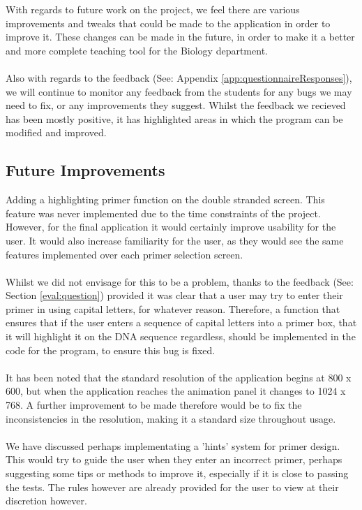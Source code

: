 With regards to future work on the project, we feel there are various improvements and tweaks that could be made to the application in order to improve it. These changes can be made in the future, in order to make it a better and more complete teaching tool for the Biology department. \\ \\
Also with regards to the feedback (See: Appendix \ref{app:questionnaireResponses}), we will continue to monitor any feedback from the students for any bugs we may need to fix, or any improvements they suggest. Whilst the feedback we recieved has been mostly positive, it has highlighted areas in which the program can be modified and improved.

\subsection{Future Improvements}

Adding a highlighting primer function on the double stranded screen. This feature was never implemented due to the time constraints of the project. However, for the final application it would certainly improve usability for the user. It would also increase familiarity for the user, as they would see the same features implemented over each primer selection screen. \\ \\

Whilst we did not envisage for this to be a problem, thanks to the feedback (See: Section \ref{eval:question}) provided it was clear that a user may try to enter their primer in using capital letters, for whatever reason. Therefore, a function that ensures that if the user enters a sequence of capital letters into a primer box, that it will highlight it on the DNA sequence regardless, should be implemented in the code for the program, to ensure this bug is fixed. \\ \\

It has been noted that the standard resolution of the application begins at 800 x 600, but when the application reaches the animation panel it changes to 1024 x 768. A further improvement to be made therefore would be to fix the inconsistencies in the resolution, making it a standard size throughout usage. \\ \\

We have discussed perhaps implementating a 'hints' system for primer design. This would try to guide the user when they enter an incorrect primer, perhaps suggesting some tips or methods to improve it, especially if it is close to passing the tests. The rules however are already provided for the user to view at their discretion however. \\ \\

